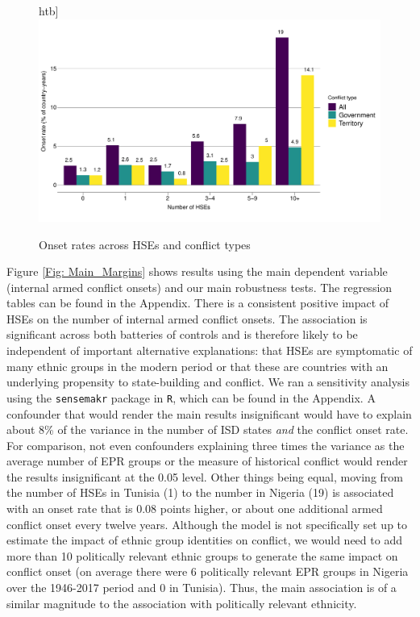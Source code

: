 \begin{figure}htb]
\includegraphics[width=\textwidth,keepaspectratio]{img/hse_onset_rates.pdf}
\caption{Onset rates across HSEs and conflict types} \label{Fig: Onset_rates}
\end{figure}

Figure \ref{Fig: Main_Margins} shows results using the main dependent variable
(internal armed conflict onsets) and our main robustness tests. The regression
tables can be found in the Appendix. There is a consistent positive impact of
HSEs on the number of internal armed conflict onsets. The association is
significant across both batteries of controls and is therefore likely to be
independent of important alternative explanations: that HSEs are symptomatic of
many ethnic groups in the modern period or that these are countries with an
underlying propensity to state-building and conflict. We ran a sensitivity
analysis using the \texttt{sensemakr} package in \texttt{R}, which can be found
in the Appendix. A confounder that would render the main results insignificant
would have to explain about 8\% of the variance in the number of ISD states
\textit{and} the conflict onset rate. For comparison, not even confounders
explaining three times the variance as the average number of EPR groups or the
measure of historical conflict would render the results insignificant at the
0.05 level.  Other things being equal, moving from the number of HSEs in Tunisia
(1) to the number in Nigeria (19) is associated with an onset rate that is 0.08
points higher, or about one additional armed conflict onset every twelve years.
Although the model is not specifically set up to estimate the impact of ethnic
group identities on conflict, we would need to add more than 10 politically
relevant ethnic groups to generate the same impact on conflict onset (on average
there were 6 politically relevant EPR groups in Nigeria over the 1946-2017
period and 0 in Tunisia). Thus, the main association is of a similar magnitude
to the association with politically relevant ethnicity. 

